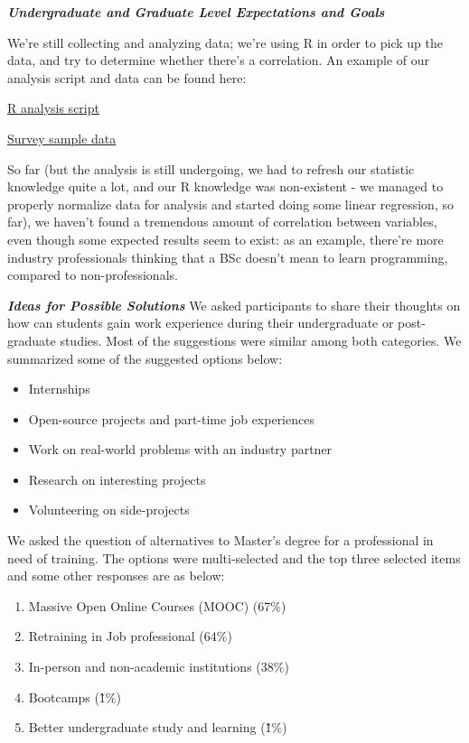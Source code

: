 \documentclass{sigchi}
\begin{document}
\textit{\textbf{Undergraduate and Graduate Level Expectations and Goals}}\newline

We're still collecting and analyzing data; we're using R in order to pick up the data, and try to determine whether there's a correlation.\newline
An example of our analysis script and data can be found here:

\href{https://www.dropbox.com/s/hs6p85pte1o8tie/answers_pare.R?dl=0}{R analysis script}

\href{https://www.dropbox.com/s/mbvigipou0txxeh/answers2.csv?dl=0}{Survey sample data}

So far (but the analysis is still undergoing, we had to refresh our statistic knowledge quite a lot, and our R knowledge was non-existent - we managed to properly normalize data for analysis and started doing some linear regression, so far), we haven't found a tremendous amount of correlation between variables, even though some expected results seem to exist: as an example, there're more industry professionals thinking that a BSc doesn't mean to learn programming, compared to non-professionals.


\textit{\textbf{Ideas for Possible Solutions}}\newline
We asked participants to share their thoughts on how can students gain work experience during their undergraduate or post-graduate studies. Most of the suggestions were similar among both categories. We summarized some of the suggested options below:
\begin{itemize}
	\item Internships
	\item Open-source projects and part-time job experiences
	\item Work on real-world problems with an industry partner
	\item Research on interesting projects
	\item Volunteering on side-projects
\end{itemize}

We asked the question of alternatives to Master's degree for a professional in need of training.  The options were multi-selected and the top three selected items and some other responses are as below:
\begin{enumerate}
	\item Massive Open Online Courses (MOOC) (67\%)
	\item Retraining in Job professional (64\%)
	\item In-person and non-academic institutions (38\%)
	\item Bootcamps (\~ 1\%)
	\item Better undergraduate study and learning (\~ 1\%)
\end{enumerate}
\end{document}
